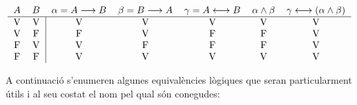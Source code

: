 \begin{equation*}
\begin{tabular}{lllllll}
$A$ & $B$ & $\alpha=A\longrightarrow B$ & $\beta=B\longrightarrow A$ & $\gamma=A\longleftrightarrow B$ & $\alpha\wedge\beta$ & $\gamma
\longleftrightarrow\left( \alpha\wedge\beta\right) $ \\ \hline
\multicolumn{1}{c}{V} & \multicolumn{1}{c|}{V} & \multicolumn{1}{c}{V} &
\multicolumn{1}{c}{V} & \multicolumn{1}{c}{V} & \multicolumn{1}{c}{V} &
\multicolumn{1}{c}{V} \\
\multicolumn{1}{c}{V} & \multicolumn{1}{c|}{F} & \multicolumn{1}{c}{F} &
\multicolumn{1}{c}{V} & \multicolumn{1}{c}{F} & \multicolumn{1}{c}{F} &
\multicolumn{1}{c}{V} \\
\multicolumn{1}{c}{F} & \multicolumn{1}{c|}{V} & \multicolumn{1}{c}{V} &
\multicolumn{1}{c}{F} & \multicolumn{1}{c}{F} & \multicolumn{1}{c}{F} &
\multicolumn{1}{c}{V} \\
\multicolumn{1}{c}{F} & \multicolumn{1}{c|}{F} & \multicolumn{1}{c}{V} &
\multicolumn{1}{c}{V} & \multicolumn{1}{c}{V} & \multicolumn{1}{c}{V} &
\multicolumn{1}{c}{V}\end{tabular}
\end{equation*}

A continuació s'enumeren algunes equivalències lògiques que
seran particularment útils i al seu costat el nom pel qual són
conegudes:

